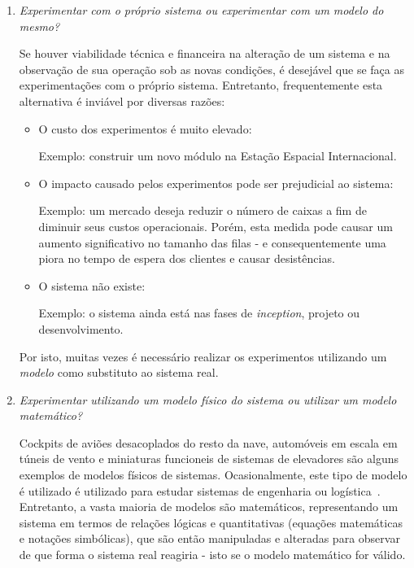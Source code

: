 \begin{enumerate}
\item \textit{Experimentar com o próprio sistema ou experimentar com um modelo do mesmo?}

Se houver viabilidade técnica e financeira na alteração de um sistema e na
observação de sua operação sob as novas condições, é desejável que se faça as
experimentações com o próprio sistema. Entretanto, frequentemente esta
alternativa é inviável por diversas razões:

\begin{itemize}
  \item O custo dos experimentos é muito elevado:

  Exemplo: construir um novo módulo na Estação Espacial Internacional.

  \item O impacto causado pelos experimentos pode ser prejudicial ao sistema:

  Exemplo: um mercado deseja reduzir o número de caixas a fim de diminuir seus
custos operacionais. Porém, esta medida pode causar um aumento significativo no
tamanho das filas - e consequentemente uma piora no tempo de espera dos clientes
e causar desistências.

  \item O sistema não existe:

  Exemplo: o sistema ainda está nas fases de \textit{inception}, projeto ou
  desenvolvimento.
\end{itemize}

Por isto, muitas vezes é necessário realizar os experimentos utilizando um
\textit{modelo} como substituto ao sistema real.

\item \textit{Experimentar utilizando um modelo físico do sistema ou utilizar um modelo
matemático?}

Cockpits de aviões desacoplados do resto da nave, automóveis em escala em túneis
de vento e miniaturas funcioneis de sistemas de elevadores são alguns exemplos
de modelos físicos de sistemas. Ocasionalmente, este tipo de modelo é utilizado
é utilizado para estudar sistemas de engenharia ou logística~\cite{Law}.
Entretanto, a vasta maioria de modelos são matemáticos, representando um sistema
em termos de relações lógicas e quantitativas (equações matemáticas e notações
simbólicas), que são então manipuladas e alteradas para observar de que forma o
sistema real reagiria - isto se o modelo matemático for válido.


\end{enumerate}
